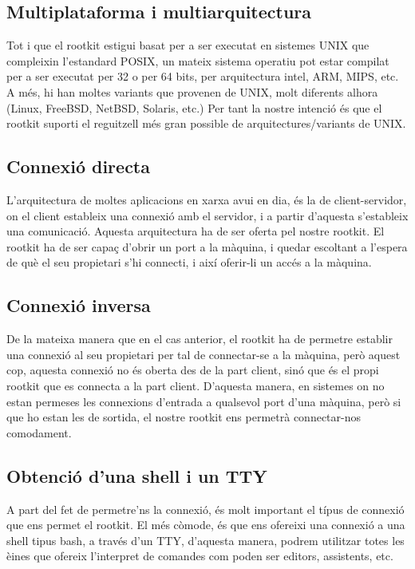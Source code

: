 \subsection{Multiplataforma i multiarquitectura}
Tot i que el rootkit estigui basat per a ser executat en sistemes UNIX que compleixin l'estandard POSIX, un mateix sistema 
operatiu pot estar compilat per a ser executat per 32 o per 64 bits, per arquitectura intel, ARM, MIPS, etc. A més, hi han
moltes variants que provenen de UNIX, molt diferents alhora (Linux, FreeBSD, NetBSD, Solaris, etc.) Per tant la nostre
intenció és que el rootkit suporti el reguitzell més gran possible de arquitectures/variants de UNIX.

\subsection{Connexió directa}
L'arquitectura de moltes aplicacions en xarxa avui en dia, és la de client-servidor, on el client estableix una connexió
amb el servidor, i a partir d'aquesta s'estableix una comunicació. Aquesta arquitectura ha de ser oferta pel nostre rootkit. 
El rootkit ha de ser capaç d'obrir un port a la màquina, i quedar escoltant a l'espera de què el seu propietari s'hi connecti,
i així oferir-li un accés a la màquina.

\subsection{Connexió inversa}
De la mateixa manera que en el cas anterior, el rootkit ha de permetre establir una connexió al seu propietari per tal de connectar-se
a la màquina, però aquest cop, aquesta connexió no és oberta des de la part client, sinó que és el propi rootkit que es connecta 
a la part client. D'aquesta manera, en sistemes on no estan permeses les connexions d'entrada a qualsevol port d'una màquina, però si
que ho estan les de sortida, el nostre rootkit ens permetrà connectar-nos comodament.

\subsection{Obtenció d'una shell i un TTY}
A part del fet de permetre'ns la connexió, és molt important el típus de connexió que ens permet el rootkit. El més còmode, és que ens
ofereixi una connexió a una shell tipus bash, a través d'un TTY, d'aquesta manera, podrem utilitzar totes les èines
que ofereix l'interpret de comandes com poden ser editors, assistents, etc.

